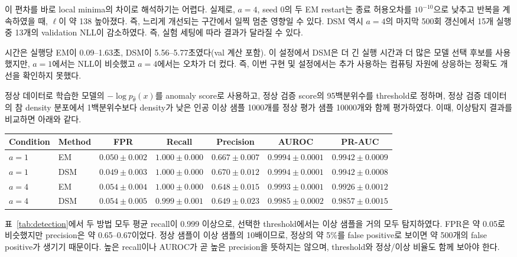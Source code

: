 \documentclass[a4paper,11pt]{article}
\numberwithin{equation}{section}
\begin{document}
\label{sec:conv-record}%
이 편차를 바로 local minima의 차이로 해석하기는 어렵다.
실제로, $a=4$, seed 0의 두 EM restart는 종료 허용오차를 $10^{-10}$으로 낮추고 반복을 계속하였을 때, $\ell$이 약 138 높아졌다. 즉, 느리게 개선되는 구간에서 일찍 멈춘 영향일 수 있다.
DSM 역시 $a=4$의 마지막 500회 갱신에서 15개 실행 중 13개의 validation NLL이 감소하였다.
즉, 실험 세팅에 따라 결과가 달라질 수 있다.

시간은 실행당 EM이 0.09--1.63초, DSM이 5.56--5.77초였다(val 계산 포함).
이 설정에서 DSM은 더 긴 실행 시간과 더 많은 모델 선택 후보를 사용했지만,
$a=1$에서는 NLL이 비슷했고 $a=4$에서는 오차가 더 컸다.
즉, 이번 구현 및 설정에서는 추가 사용하는 컴퓨팅 자원에 상응하는 정확도 개선을 확인하지 못했다.

정상 데이터로 학습한 모델의 $-\log p_{\widehat\theta}(x)$를 anomaly score로 사용하고,
정상 검증 score의 95백분위수를 threshold로 정하며,
정상 검증 데이터의 참 density 분포에서 1백분위수보다 density가 낮은 인공 이상 샘플 1000개를
정상 평가 샘플 10000개와 함께 평가하였다.
이때, 이상탐지 결과를 비교하면 아래와 같다.
\begin{center}\begin{minipage}{\linewidth}\centering
{}
\label{tab:detection}
\small
\setlength{\tabcolsep}{3pt}
\begin{tabular}{@{}llccccc@{}}
\toprule
Condition & Method & FPR & Recall & Precision & AUROC & PR-AUC \\
\midrule
$a=1$ & EM & $0.050\pm0.002$ & $1.000\pm0.000$ & $0.667\pm0.007$ & $0.9994\pm0.0001$ & $0.9942\pm0.0009$ \\
$a=1$ & DSM & $0.049\pm0.003$ & $1.000\pm0.000$ & $0.670\pm0.012$ & $0.9994\pm0.0001$ & $0.9942\pm0.0008$ \\
\addlinespace
$a=4$ & EM & $0.054\pm0.004$ & $1.000\pm0.000$ & $0.648\pm0.015$ & $0.9993\pm0.0001$ & $0.9926\pm0.0012$ \\
$a=4$ & DSM & $0.054\pm0.005$ & $0.999\pm0.001$ & $0.649\pm0.023$ & $0.9985\pm0.0002$ & $0.9857\pm0.0015$ \\
\bottomrule
\end{tabular}
\end{minipage}\end{center}

표~\ref{tab:detection}에서 두 방법 모두 평균 recall이 0.999 이상으로,
선택한 threshold에서는 이상 샘플을 거의 모두 탐지하였다.
FPR은 약 0.05로 비슷했지만 precision은 약 0.65--0.67이었다.
정상 샘플이 이상 샘플의 10배이므로, 정상의 약 5\%를 false positive로 보이면 약 500개의 false positive가 생기기 때문이다.
높은 recall이나 AUROC가 곧 높은 precision을 뜻하지는 않으며, threshold와 정상/이상 비율도 함께 보아야 한다.
\end{document}
